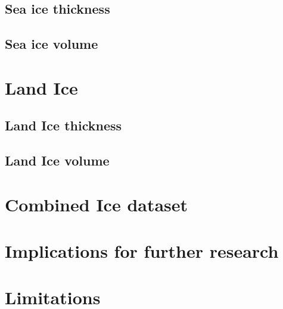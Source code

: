 \documentclass[../main.tex]{subfiles}
\begin{document}
\subsection{Sea ice thickness}
\subsection{Sea ice volume}


\section{Land Ice}
\subsection{Land Ice thickness}
\subsection{Land Ice volume}

\section{Combined Ice dataset}


\section{Implications for further research}

\section{Limitations}
\end{document}
